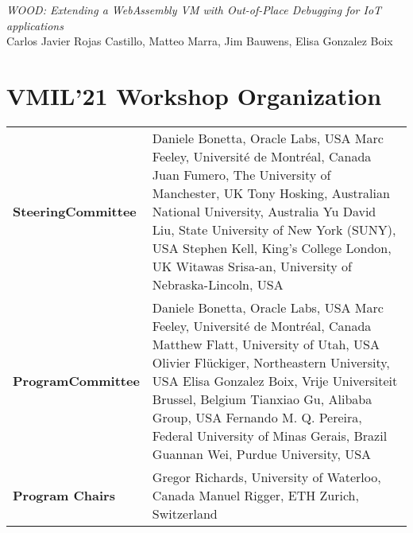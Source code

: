 \documentclass[12pt,letterpaper]{article}
\newcommand{\vmil}{VMIL'21\xspace}
\begin{document}
\noindent
\emph{WOOD: Extending a WebAssembly VM with Out-of-Place Debugging for IoT applications}\\
Carlos Javier Rojas Castillo, Matteo Marra, Jim Bauwens, Elisa Gonzalez Boix
~\\

\clearpage


\section*{\vmil Workshop Organization}

\begin{table*}[h!]
\begin{tabular}{p{2.2cm}p{10.9cm}}
\textbf{Steering\newline{}Committee} &
Daniele Bonetta, Oracle Labs, USA\newline
Marc Feeley, Université de Montréal, Canada\newline
Juan Fumero, The University of Manchester, UK\newline
Tony Hosking, Australian National University, Australia\newline
Yu David Liu, State University of New York (SUNY), USA
Stephen Kell, King's College London, UK\newline
Witawas Srisa-an, University of Nebraska-Lincoln, USA\newline
\newline
\\
\textbf{Program\newline Committee} &
Daniele Bonetta, Oracle Labs, USA\newline
Marc Feeley, Université de Montréal, Canada\newline
Matthew Flatt, University of Utah, USA\newline
Olivier Flückiger, Northeastern University, USA\newline
Elisa Gonzalez Boix, Vrije Universiteit Brussel, Belgium\newline
Tianxiao Gu, Alibaba Group, USA\newline
Fernando M. Q. Pereira, Federal University of Minas Gerais, Brazil\newline
Guannan Wei, Purdue University, USA\newline
\\
\textbf{Program Chairs} &
Gregor Richards, University of Waterloo, Canada\newline
Manuel Rigger, ETH Zurich, Switzerland\newline

\end{tabular}
\end{table*}
\end{document}
